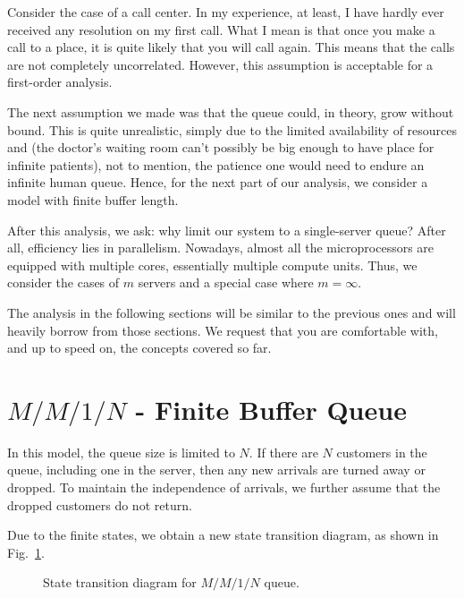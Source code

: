 \documentclass[11pt, a4paper]{report}
\begin{document}
Consider the case of a call center. In my experience, at least, I have hardly ever received any resolution on my first call. What I mean is that once you make a call to a place, it is quite likely that you will call again. This means that the calls are not completely uncorrelated. However, this assumption is acceptable for a first-order analysis.

The next assumption we made was that the queue could, in theory, grow without bound. This is quite unrealistic, simply due to the limited availability of resources and (the doctor's waiting room can't possibly be big enough to have place for infinite patients), not to mention, the patience one would need to endure an infinite human queue. Hence, for the next part of our analysis, we consider a model with finite buffer length.

After this analysis, we ask: why limit our system to a single-server queue? After all, efficiency lies in parallelism. Nowadays, almost all the microprocessors are equipped with multiple cores, essentially multiple compute units. Thus, we consider the cases of $m$ servers and a special case where $m = \infty$.

The analysis in the following sections will be similar to the previous ones and will heavily borrow from those sections. We request that you are comfortable with, and up to speed on, the concepts covered so far.

\section{$M/M/1/N$ - Finite Buffer Queue}

In this model, the queue size is limited to $N$. If there are $N$ customers in the queue, including one in the server, then any new arrivals are turned away or dropped. To maintain the independence of arrivals, we further assume that the dropped customers do not return.

Due to the finite states, we obtain a new state transition diagram, as shown in Fig.~\ref{fig:mm1N_std}.

\begin{figure}
    \centering
    
    \caption{State transition diagram for $M/M/1/N$ queue.}
    \label{fig:mm1N_std}
\end{figure}
\end{document}
